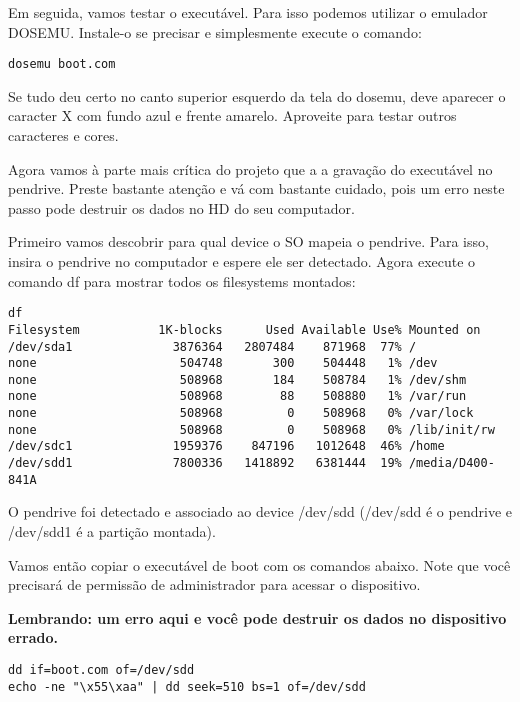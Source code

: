 Em seguida, vamos testar o executável. Para isso podemos utilizar o emulador DOSEMU. Instale-o se precisar e simplesmente execute o comando:

\begin{espacosimples}
\begin{verbatim}
dosemu boot.com
\end{verbatim}
\end{espacosimples}

Se tudo deu certo no canto superior esquerdo da tela do dosemu, deve aparecer o  caracter X com fundo azul e frente amarelo. Aproveite para testar outros caracteres e cores.

Agora vamos à parte mais crítica do projeto que a a gravação do executável no pendrive. Preste bastante atenção e vá com bastante cuidado, pois um erro neste passo pode destruir os dados no HD do seu computador.

Primeiro vamos descobrir para qual device o SO mapeia o pendrive. Para isso, insira o pendrive no computador e espere ele ser detectado. Agora execute o comando df para mostrar todos os filesystems montados:

\begin{espacosimples}
\begin{verbatim}
df
Filesystem           1K-blocks      Used Available Use% Mounted on
/dev/sda1              3876364   2807484    871968  77% /
none                    504748       300    504448   1% /dev
none                    508968       184    508784   1% /dev/shm
none                    508968        88    508880   1% /var/run
none                    508968         0    508968   0% /var/lock
none                    508968         0    508968   0% /lib/init/rw
/dev/sdc1              1959376    847196   1012648  46% /home
/dev/sdd1              7800336   1418892   6381444  19% /media/D400-841A
\end{verbatim}
\end{espacosimples}

O pendrive foi detectado e associado ao device /dev/sdd (/dev/sdd é o pendrive e /dev/sdd1 é a partição montada).

Vamos então copiar o executável de boot com os comandos abaixo. Note que você precisará de permissão de administrador para acessar o dispositivo.

\textbf{Lembrando: um erro aqui e você pode destruir os dados no dispositivo errado.}

\begin{espacosimples}
\begin{verbatim}
dd if=boot.com of=/dev/sdd
echo -ne "\x55\xaa" | dd seek=510 bs=1 of=/dev/sdd
\end{verbatim}
\end{espacosimples}

